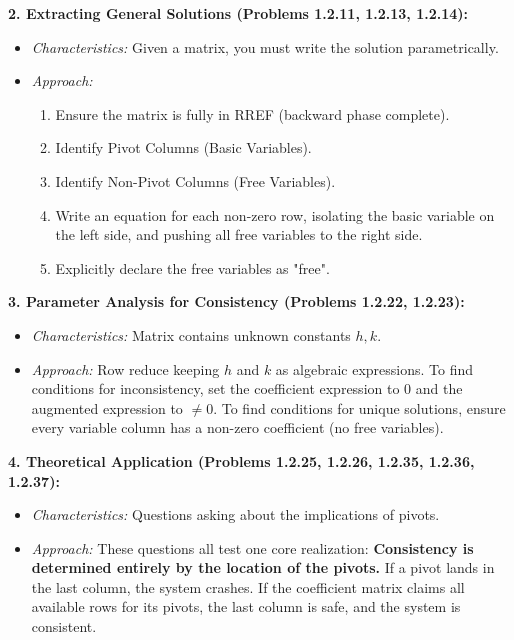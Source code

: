 \documentclass[11pt]{article}
\begin{document}
\textbf{2. Extracting General Solutions (Problems 1.2.11, 1.2.13, 1.2.14):}
\begin{itemize}
    \item \textit{Characteristics:} Given a matrix, you must write the solution parametrically.
    \item \textit{Approach:} 
    \begin{enumerate}
        \item Ensure the matrix is fully in RREF (backward phase complete).
        \item Identify Pivot Columns (Basic Variables).
        \item Identify Non-Pivot Columns (Free Variables).
        \item Write an equation for each non-zero row, isolating the basic variable on the left side, and pushing all free variables to the right side.
        \item Explicitly declare the free variables as "free".
    \end{enumerate}
\end{itemize}

\textbf{3. Parameter Analysis for Consistency (Problems 1.2.22, 1.2.23):}
\begin{itemize}
    \item \textit{Characteristics:} Matrix contains unknown constants $h, k$. 
    \item \textit{Approach:} Row reduce keeping $h$ and $k$ as algebraic expressions. To find conditions for inconsistency, set the coefficient expression to $0$ and the augmented expression to $\neq 0$. To find conditions for unique solutions, ensure every variable column has a non-zero coefficient (no free variables).
\end{itemize}

\textbf{4. Theoretical Application (Problems 1.2.25, 1.2.26, 1.2.35, 1.2.36, 1.2.37):}
\begin{itemize}
    \item \textit{Characteristics:} Questions asking about the implications of pivots.
    \item \textit{Approach:} These questions all test one core realization: \textbf{Consistency is determined entirely by the location of the pivots.} If a pivot lands in the last column, the system crashes. If the coefficient matrix claims all available rows for its pivots, the last column is safe, and the system is consistent.
\end{itemize}
\end{document}
